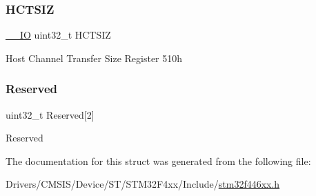 \subsubsection{\texorpdfstring{H\+C\+T\+S\+IZ}{HCTSIZ}}
{\footnotesize\ttfamily \mbox{\hyperlink{core__sc300_8h_aec43007d9998a0a0e01faede4133d6be}{\+\_\+\+\_\+\+IO}} uint32\+\_\+t H\+C\+T\+S\+IZ}

Host Channel Transfer Size Register 510h \mbox{\label{struct_u_s_b___o_t_g___host_channel_type_def_ae930d94b6a3272fed7c42c1a02929924}} 
\subsubsection{\texorpdfstring{Reserved}{Reserved}}
{\footnotesize\ttfamily uint32\+\_\+t Reserved\mbox{[}2\mbox{]}}

Reserved 

The documentation for this struct was generated from the following file\+:\begin{DoxyCompactItemize}
\item 
Drivers/\+C\+M\+S\+I\+S/\+Device/\+S\+T/\+S\+T\+M32\+F4xx/\+Include/\mbox{\hyperlink{stm32f446xx_8h}{stm32f446xx.\+h}}\end{DoxyCompactItemize}
